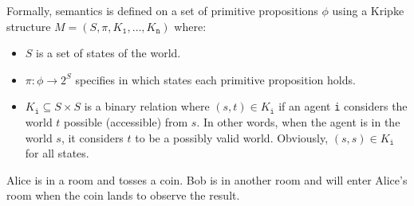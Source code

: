 \begin{description}
        Formally, semantics is defined on a set of primitive propositions $\phi$ 
        using a Kripke structure $M = (S, \pi, K_\texttt{1}, \dots, K_\texttt{n})$ where:
        \begin{itemize}
            \item $S$ is a set of states of the world.
            \item $\pi: \phi \rightarrow 2^S$ specifies in which states each primitive proposition holds.
            \item $K_\texttt{i} \subseteq S \times S$ is a binary relation where 
                $(s, t) \in K_\texttt{i}$ if an agent \texttt{i} considers the world $t$ possible (accessible) from $s$.
                In other words, when the agent is in the world $s$, it considers $t$ to be a possibly valid world.
                Obviously, $(s, s) \in K_\texttt{i}$ for all states.
        \end{itemize}

        \begin{example}
            Alice is in a room and tosses a coin. Bob is in another room and will enter Alice's room when the coin lands to observe the result.


\end{example}
\end{description}
